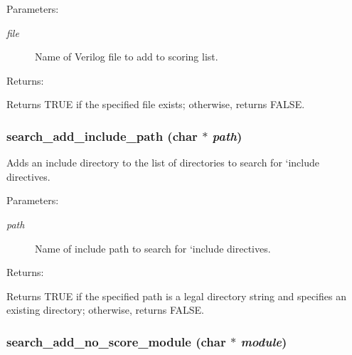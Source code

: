 \begin{Desc}
\item[Parameters: ]\par
\begin{description}
\item[{\em 
file}]Name of Verilog file to add to scoring list. \end{description}
\end{Desc}
\begin{Desc}
\item[Returns: ]\par
Returns TRUE if the specified file exists; otherwise, returns FALSE. \end{Desc}
\subsubsection{ search\_\-add\_\-include\_\-path (char $\ast$ {\em path})}\label{search_8h_a1}


Adds an include directory to the list of directories to search for `include directives.

\begin{Desc}
\item[Parameters: ]\par
\begin{description}
\item[{\em 
path}]Name of include path to search for `include directives. \end{description}
\end{Desc}
\begin{Desc}
\item[Returns: ]\par
Returns TRUE if the specified path is a legal directory string and specifies an existing directory; otherwise, returns FALSE. \end{Desc}
\subsubsection{ search\_\-add\_\-no\_\-score\_\-module (char $\ast$ {\em module})}\label{search_8h_a4}


